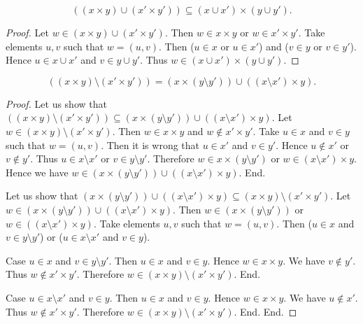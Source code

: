 \documentclass[../../sets-and-functions.ftl.tex]{subfiles}
\begin{document}
\begin{forthel}
    \begin{proposition}[SF 01 05 687547]
      \[ ((x \times y) \cup (x' \times y')) \subseteq (x \cup x') \times (y \cup y'). \]
    \end{proposition}
    \begin{proof}
      Let $w \in (x \times y) \cup (x' \times y')$.
      Then $w \in x \times y$ or $w \in x' \times y'$.
      Take elements $u,v$ such that $w = (u,v)$.
      Then ($u \in x$ or $u \in x'$) and ($v \in y$ or $v \in y'$).
      Hence $u \in x \cup x'$ and $v \in y \cup y'$.
      Thus $w \in (x \cup x') \times (y \cup y')$.
    \end{proof}

    \begin{proposition}[SF 01 05 247770]
      \[ ((x \times y) \setminus (x' \times y')) = (x \times (y \setminus y')) \cup ((x \setminus x') \times y). \]
    \end{proposition}
    \begin{proof}
      Let us show that $((x \times y) \setminus (x' \times y')) \subseteq (x \times (y \setminus y')) \cup ((x \setminus x') \times y)$.
        Let $w \in (x \times y) \setminus (x' \times y')$.
        Then $w \in x \times y$ and $w \notin x' \times y'$.
        Take $u \in x$ and $v \in y$ such that $w = (u,v)$.
        Then it is wrong that $u \in x'$ and $v \in y'$.
        Hence $u \notin x'$ or $v \notin y'$.
        Thus $u \in x \setminus x'$ or $v \in y \setminus y'$.
        Therefore $w \in x \times (y \setminus y')$ or $w \in (x \setminus x') \times y$.
        Hence we have $w \in (x \times (y \setminus y')) \cup ((x \setminus x') \times y)$.
      End.

      Let us show that $(x \times (y \setminus y')) \cup ((x \setminus x') \times y) \subseteq (x \times y) \setminus (x' \times y')$.
        Let $w \in (x \times (y \setminus y')) \cup ((x \setminus x') \times y)$.
        Then $w \in (x \times (y \setminus y'))$ or $w \in ((x \setminus x') \times y)$.
        Take elements $u,v$ such that $w = (u,v)$.
        Then ($u \in x$ and $v \in y \setminus y'$) or ($u \in x \setminus x'$ and $v \in y$).

        Case $u \in x$ and $v \in y \setminus y'$.
          Then $u \in x$ and $v \in y$.
          Hence $w \in x \times y$.
          We have $v \notin y'$.
          Thus $w \notin x' \times y'$.
          Therefore $w \in (x \times y) \setminus (x' \times y')$.
        End.

        Case $u \in x \setminus x'$ and $v \in y$.
          Then $u \in x$ and $v \in y$.
          Hence $w \in x \times y$.
          We have $u \notin x'$.
          Thus $w \notin x' \times y'$.
          Therefore $w \in (x \times y) \setminus (x' \times y')$.
        End.
      End.
    \end{proof}
  \end{forthel}
\end{document}
